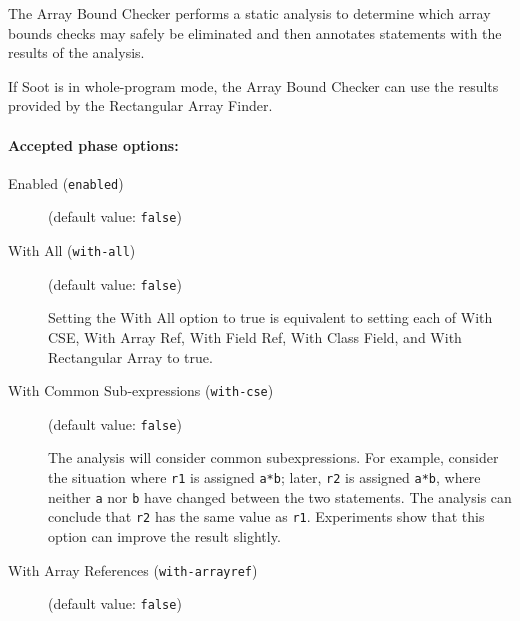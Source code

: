 \documentclass{article}
\begin{document}
\par

The Array Bound Checker performs a static analysis to determine
which array bounds checks may safely be eliminated and then annotates
statements with the results of the analysis.

\par

If Soot is in whole-program mode, the Array Bound Checker can
use the results provided by the Rectangular Array Finder.
                        

\paragraph{Accepted phase options:} 

\begin{description}

\item[Enabled ({\tt enabled})]
(default value: {\tt false})






\item[With All ({\tt with-all})]
(default value: {\tt false})





\par

Setting the With All option to true is equivalent to setting each
of With CSE, With Array Ref, With Field Ref,
With Class Field, and  With Rectangular Array to true.
                        


\item[With Common Sub-expressions ({\tt with-cse})]
(default value: {\tt false})





\par

The analysis will consider common subexpressions.  For example,
consider the situation where {\tt r1} is assigned
{\tt a*b}; later, {\tt r2} is assigned {\tt a*b}, where
neither {\tt a} nor {\tt b} have changed between the two
statements. The analysis can conclude that {\tt r2} has the
same value as {\tt r1}. Experiments show that this option can
improve the result slightly.



\item[With Array References ({\tt with-arrayref})]
(default value: {\tt false})






\end{description}
\end{document}
